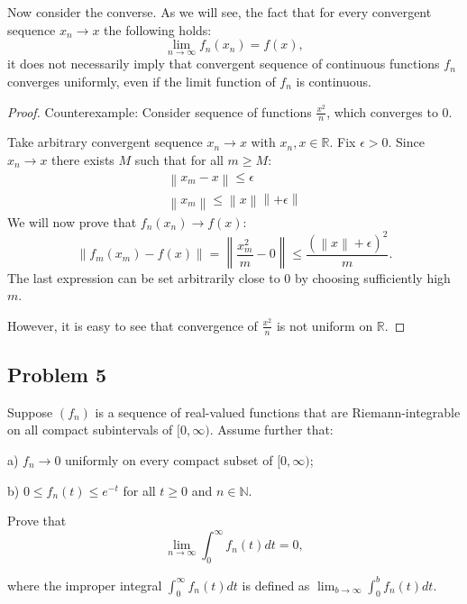 \documentclass{article}
\newcommand{\R}{\mathbb{R}}
\newcommand{\N}{\mathbb{N}}
\newcommand{\norm}[1]{\left\lVert #1 \right\rVert}
\begin{document}
Now consider the converse. As we will see, the fact that for every convergent sequence $x_n \to x$ the following holds:
\[ \lim_{n \to \infty} f_n(x_n) = f(x), \]
it does not necessarily imply that convergent sequence of continuous functions $f_n$ converges uniformly, even if the limit function of $f_n$ is continuous.

\begin{proof}

Counterexample: Consider sequence of functions $\frac{x^2}{n}$, which converges to $0$.

Take arbitrary convergent sequence $x_n \to x$ with $x_n,x \in \R$. Fix $\epsilon>0$. Since $x_n \to x$ there exists $M$ such that for all $m \geq M$:
\begin{gather*}
    \norm{ x_m - x } \leq \epsilon \\
    \norm{ x_m } \leq \norm{ x } \norm{ + \epsilon }
\end{gather*}
We will now prove that $f_n(x_n) \to f(x)$:
\[ \norm{ f_m(x_m) - f(x) } = \norm{ \frac{x_m^2}{m} - 0 } \leq \frac{(\norm{ x } + \epsilon)^2}{m}. \]
The last expression can be set arbitrarily close to $0$ by choosing sufficiently high $m$.

However, it is easy to see that convergence of $\frac{x^2}{n}$ is not uniform on $\R$.

\end{proof}


\subsection*{Problem 5}

\begin{tcolorbox}
Suppose $(f_n)$ is a sequence of real-valued functions that are Riemann-integrable on all compact subintervals of $[0,\infty)$. Assume further that:

a) $f_n \to 0$ uniformly on every compact subset of $[0,\infty)$;

b) $0 \leq f_n(t) \leq e^{-t}$ for all $t \geq 0$ and $n \in \N$.

Prove that
\[ \lim_{n \to \infty} \int_0^\infty f_n(t) dt = 0, \]

where the improper integral $\int_0^\infty f_n(t) dt$ is defined as  $\lim_{b\to\infty} \int_0^b f_n(t) dt$.
\end{tcolorbox}
\end{document}
